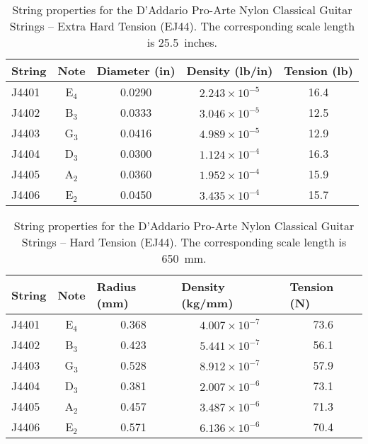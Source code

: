 \begin{table}[htbp]
  \centering
  \caption{\label{tbl:ej44_ips} String properties for the D'Addario Pro-Arte Nylon Classical Guitar Strings -- Extra Hard Tension (EJ44). The corresponding scale length is 25.5~inches.}
    \begin{tabular}{lcccc}
    \hline \hline
    String  & Note  & \multicolumn{1}{l}{Diameter (in)} & \multicolumn{1}{l}{Density (lb/in)} & \multicolumn{1}{l}{Tension (lb)} \\
    \hline
    J4401 & E$_4$  & 0.0290 & $2.243 \times 10^{-5}$ & 16.4 \\
    J4402 & B$_3$  & 0.0333 & $3.046 \times 10^{-5}$ & 12.5 \\
    J4403 & G$_3$  & 0.0416 & $4.989 \times 10^{-5}$ & 12.9 \\
    J4404 & D$_3$  & 0.0300 & $1.124 \times 10^{-4}$ & 16.3 \\
    J4405 & A$_2$  & 0.0360 & $1.952 \times 10^{-4}$ & 15.9 \\
    J4406 & E$_2$  & 0.0450 & $3.435 \times 10^{-4}$ & 15.7 \\
    \hline
    \end{tabular}%
  \label{tab:addlabel}%
\end{table}%

\begin{table}[htbp]
  \centering
  \caption{\label{tbl:ej44_mks} String properties for the D'Addario Pro-Arte Nylon Classical Guitar Strings -- Hard Tension (EJ44). The corresponding scale length is 650~mm.}
    \begin{tabular}{lcccc}
    \hline \hline
    String  & Note  & \multicolumn{1}{l}{Radius (mm)} & \multicolumn{1}{l}{Density (kg/mm)} & \multicolumn{1}{l}{Tension (N)} \\
    \hline
    J4401 & E$_4$  & 0.368 & $4.007 \times 10^{-7}$ & 73.6 \\
    J4402 & B$_3$  & 0.423 & $5.441 \times 10^{-7}$ & 56.1 \\
    J4403 & G$_3$  & 0.528 & $8.912 \times 10^{-7}$ & 57.9 \\
    J4404 & D$_3$  & 0.381 & $2.007 \times 10^{-6}$ & 73.1 \\
    J4405 & A$_2$  & 0.457 & $3.487 \times 10^{-6}$ & 71.3 \\
    J4406 & E$_2$  & 0.571 & $6.136 \times 10^{-6}$ & 70.4 \\
    \hline
    \end{tabular}%
  \label{tab:addlabel}%
\end{table}%
